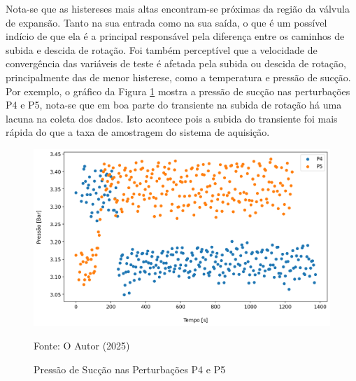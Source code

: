 Nota-se que as histereses mais altas encontram-se próximas da região da válvula de expansão. Tanto na sua entrada como na sua saída, o que é um possível indício de que ela é a principal responsável pela diferença entre os caminhos de subida e descida de rotação. Foi também perceptível que a velocidade de convergência das variáveis de teste é afetada pela subida ou descida de rotação, principalmente das de menor histerese, como a temperatura e pressão de sucção. Por exemplo, o gráfico da Figura \ref{fig:PressãodeSucçãoSubidaeDescida} mostra a pressão de sucção nas perturbações P4 e P5, nota-se que em boa parte do transiente na subida de rotação há uma lacuna na coleta dos dados. Isto acontece pois a subida do transiente foi mais rápida do que a taxa de amostragem do sistema de aquisição.
\newpage
\begin{figure}[h]
    \centering
    \includegraphics[width=1\linewidth]{FigurasdoTexto/Pressão de sucção subida e descida.png}
    \caption{Pressão de Sucção nas Perturbações P4 e P5}
    \label{fig:PressãodeSucçãoSubidaeDescida}
    {\footnotesize Fonte: O Autor (2025)}
\end{figure}

